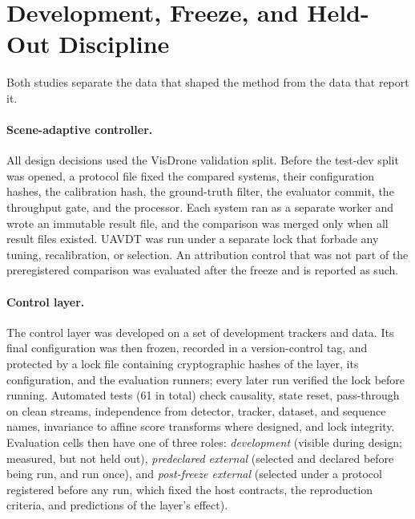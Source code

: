 \section{Development, Freeze, and Held-Out Discipline}\label{sec:m-protocol}
Both studies separate the data that shaped the method from the data that report it.

\paragraph{Scene-adaptive controller.} All design decisions used the VisDrone validation split. Before the test-dev split was opened, a protocol file fixed the compared systems, their configuration hashes, the calibration hash, the ground-truth filter, the evaluator commit, the throughput gate, and the processor. Each system ran as a separate worker and wrote an immutable result file, and the comparison was merged only when all result files existed. UAVDT was run under a separate lock that forbade any tuning, recalibration, or selection. An attribution control that was not part of the preregistered comparison was evaluated after the freeze and is reported as such.

\paragraph{Control layer.} The control layer was developed on a set of development trackers and data. Its final configuration was then frozen, recorded in a version-control tag, and protected by a lock file containing cryptographic hashes of the layer, its configuration, and the evaluation runners; every later run verified the lock before running. Automated tests (61 in total) check causality, state reset, pass-through on clean streams, independence from detector, tracker, dataset, and sequence names, invariance to affine score transforms where designed, and lock integrity. Evaluation cells then have one of three roles: \emph{development} (visible during design; measured, but not held out), \emph{predeclared external} (selected and declared before being run, and run once), and \emph{post-freeze external} (selected under a protocol registered before any run, which fixed the host contracts, the reproduction criteria, and predictions of the layer's effect).

